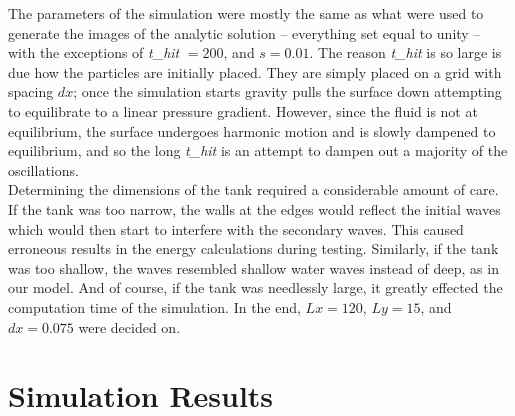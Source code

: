 The parameters of the simulation were mostly the same as what were used to generate the images of the analytic solution -- everything set equal to unity -- with the exceptions of \emph{t\_hit} $= 200$, and $s=0.01$. The reason \emph{t\_hit} is so large is due how the particles are initially placed. They are simply placed on a grid with spacing $dx$; once the simulation starts gravity pulls the surface down attempting to equilibrate to a linear pressure gradient. However, since the fluid is not at equilibrium, the surface undergoes harmonic motion and is slowly dampened to equilibrium, and so the long \emph{t\_hit} is an attempt to dampen out a majority of the oscillations. \\

Determining the dimensions of the tank required a considerable amount of care. If the tank was too narrow, the walls at the edges would reflect the initial waves which would then start to interfere with the secondary waves. This caused erroneous results in the energy calculations during testing. Similarly, if the tank was too shallow, the waves resembled shallow water waves instead of deep, as in our model. And of course, if the tank was needlessly large, it greatly effected the computation time of the simulation. In the end, $Lx = 120$, $Ly = 15$, and $dx = 0.075$ were decided on.

\section{Simulation Results}

